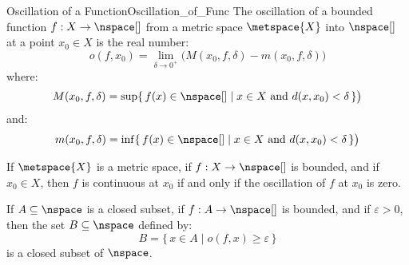 \documentclass{article}                                                        %
\begin{document}
        \begin{fdefinition}{Oscillation of a Function}{Oscillation_of_Func}
            The oscillation of a bounded function $f:X\rightarrow\nspace[]$
            from a metric space $\metspace{X}$ into $\nspace[]$ at a point
            $x_{0}\in{X}$ is the real number:
            \begin{equation*}
                o(f,x_{0})=\underset{\delta\rightarrow{0}^{+}}{\lim}
                    \big(M(x_{0},f,\delta)-m(x_{0},f,\delta)\big)
            \end{equation*}
            where:
            \begin{equation*}
                M(x_{0},f,\delta)=\sup\{\,f(x)\in\nspace[]\;|\;
                        x\in{X}\textrm{ and }d(x,x_{0})<\delta\,\}\big)
            \end{equation*}
            and:
            \begin{equation*}
                m(x_{0},f,\delta)=\inf\{\,f(x)\in\nspace[]\;|\;
                        x\in{X}\textrm{ and }d(x,x_{0})<\delta\,\}\big)
            \end{equation*}
        \end{fdefinition}
        \begin{theorem}
            If $\metspace{X}$ is a metric space, if $f:X\rightarrow\nspace[]$ is
            bounded, and if $x_{0}\in{X}$, then $f$ is continuous at $x_{0}$ if
            and only if the oscillation of $f$ at $x_{0}$ is zero.
        \end{theorem}
        \begin{theorem}
            If $A\subseteq\nspace$ is a closed subset, if
            $f:A\rightarrow\nspace[]$ is bounded, and if $\varepsilon>0$, then
            the set $B\subseteq\nspace$ defined by:
            \begin{equation}
                B=\{\,x\in{A}\;|\;o(f,x)\geq\varepsilon\,\}
            \end{equation}
            is a closed subset of $\nspace$.
        \end{theorem}
\end{document}
